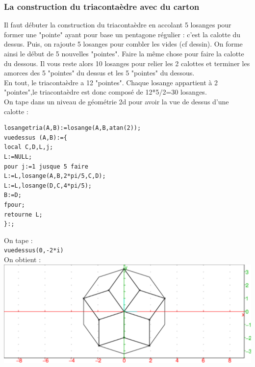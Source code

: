 \documentclass[a4paper,11pt]{book}
\begin{document}
\subsubsection{La construction du triaconta\`edre avec du carton}
Il faut d\'ebuter la construction du triaconta\`edre en accolant 5 losanges pour
 former une "pointe" ayant pour base un pentagone r\'egulier : c'est la calotte
 du dessus. Puis, on rajoute 5 losanges pour combler les vides 
(cf dessin). On forme ainsi le d\'ebut de 5 nouvelles "pointes". Faire 
la m\^eme chose pour faire la calotte du dessous. Il vous reste alors 10 
losanges pour relier les 2 calottes et terminer les amorces des 5 "pointes" du 
dessus et les 5 "pointes" du dessous.\\
En tout, le triaconta\`edre a 12 "pointes". Chaque losange appartient \`a 2 
"pointes",le triaconta\`edre est  donc compos\'e de 12*5/2=30 losanges.\\
On tape dans un niveau de g\'eom\'etrie 2d pour avoir la vue de dessus d'une 
calotte :
\begin{verbatim}
losangetria(A,B):=losange(A,B,atan(2));
vuedessus (A,B):={
local C,D,L,j;
L:=NULL;
pour j:=1 jusque 5 faire 
L:=L,losange(A,B,2*pi/5,C,D);
L:=L,losange(D,C,4*pi/5);
B:=D;
fpour;
retourne L;
}:;
\end{verbatim}
On tape :\\
{\tt vuedessus(0,-2*i)}\\
On obtient :\\
\includegraphics[width=\textwidth]{triacon}
\end{document}
